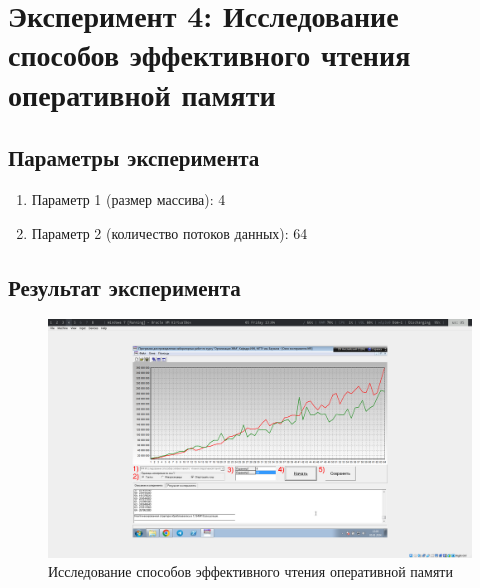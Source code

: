 \documentclass[a4paper,oneside,14pt]{extarticle}
\begin{document}



\newpage

\section{Эксперимент 4: Исследование способов эффективного чтения оперативной памяти}

\subsection{Параметры эксперимента}

\begin{enumerate}
    \item Параметр 1 (размер массива): 4
    \item Параметр 2 (количество потоков данных): 64
\end{enumerate}

\subsection{Результат эксперимента}

\begin{figure}[H]
	\centering
	\includegraphics[width=1\textwidth]{img/4.png}
    \caption{Исследование способов эффективного чтения оперативной памяти}
	\label{fig:4}
\end{figure}
\end{document}

